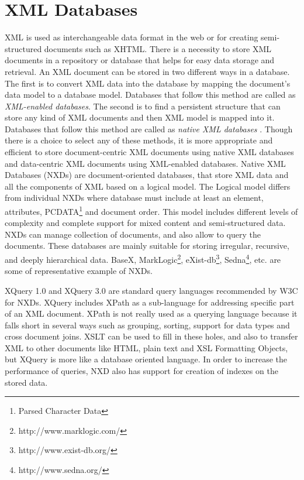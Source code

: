 \section{XML Databases}

  XML is used as interchangeable data format in the web or for creating semi-structured documents such as XHTML. There is a necessity to store XML documents in a repository or database that helps for easy data storage and retrieval. An XML document can be stored in two different ways in a database. The first is to convert XML data into the database by mapping the document's data model to a database model. Databases that follow this method are called as \textit{XML-enabled databases}. The second is to find a persistent structure that can store any kind of XML documents and then XML model is mapped into it. Databases that follow this method are called as \textit{native XML databases} \cite{pavlovic2007native}. Though there is a choice to select any of these methods, it is more appropriate and efficient to store document-centric XML documents using native XML databases and data-centric  XML documents using XML-enabled databases. Native XML Databases (NXDs) are document-oriented databases, that store XML data and all the components of XML based on a logical model. The Logical model differs from individual NXDs where database must include at least an element, attributes, PCDATA\footnote{Parsed Character Data} and document order. This model includes different levels of complexity and complete support for mixed content and semi-structured data. NXDs can manage collection of documents, and also allow to query the documents. These databases are mainly suitable for storing irregular, recursive, and deeply hierarchical data.  BaseX, MarkLogic\footnote{http://www.marklogic.com/}, eXist-db\footnote{http://www.exist-db.org/}, Sedna\footnote{http://www.sedna.org/}, etc. are some of representative example of NXDs. 
  \par XQuery 1.0 and XQuery 3.0 are standard query languages recommended by W3C for NXDs. XQuery includes XPath as a sub-language for addressing specific part of an XML document. XPath is not really used as a querying language because it falls short in several ways such as grouping, sorting, support for data types and cross document joins. XSLT can be used to fill in these holes, and also to transfer XML to other documents like HTML, plain text and XSL Formatting Objects, but XQuery is more like a database oriented language.  In order to increase the performance of queries, NXD also has support for creation of indexes on the stored data\cite{pavlovic2007native}.
